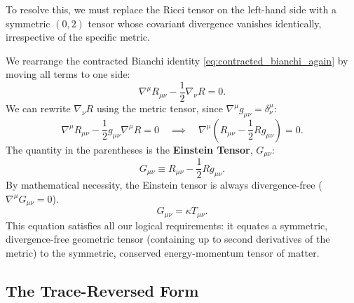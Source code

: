 \documentclass[11pt, a4paper]{report}
\begin{document}
To resolve this, we must replace the Ricci tensor on the left-hand side with a symmetric $(0,2)$ tensor whose covariant divergence vanishes identically, irrespective of the specific metric. %

We rearrange the contracted Bianchi identity \eqref{eq:contracted_bianchi_again} by moving all terms to one side:
\begin{equation}
\nabla^{\mu}R_{\mu\nu} - \frac{1}{2}\nabla_{\nu}R = 0.
\end{equation}
We can rewrite $\nabla_{\nu}R$ using the metric tensor, since $\nabla^{\mu}g_{\mu\nu} = \delta^{\mu}_{\nu}$:
\begin{equation}
\nabla^{\mu}R_{\mu\nu} - \frac{1}{2}g_{\mu\nu}\nabla^{\mu}R = 0 \quad \implies \quad \nabla^{\mu}\left( R_{\mu\nu} - \frac{1}{2}R g_{\mu\nu} \right) = 0.
\end{equation}
The quantity in the parentheses is the \textbf{Einstein Tensor}, $G_{\mu\nu}$:
\begin{equation}
\label{eq:einstein_tensor_def}
G_{\mu\nu} \equiv R_{\mu\nu} - \frac{1}{2}R g_{\mu\nu}. %
\end{equation}
By mathematical necessity, the Einstein tensor is always divergence-free ($\nabla^{\mu}G_{\mu\nu} = 0$). %
\begin{equation}
\label{eq:einstein_proposed}
G_{\mu\nu} = \kappa T_{\mu\nu}. %
\end{equation}
This equation satisfies all our logical requirements: it equates a symmetric, divergence-free geometric tensor (containing up to second derivatives of the metric) to the symmetric, conserved energy-momentum tensor of matter. %

\subsection{The Trace-Reversed Form}
\end{document}
